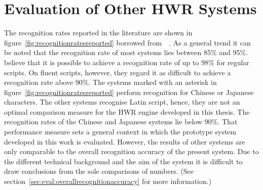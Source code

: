 


\section{Evaluation of Other HWR Systems}
\label{sec:eval:othersystems}

The recognition rates reported in the literature are shown in 
figure~\ref{fig:recognitionratesreported} borrowed 
from~~\citeyear{LiuJaegerNakagawa2004}.
As a general trend it can be noted that the recognition rate of most systems
lies between 85\% and 95\%. 
~\citeyear{LiuJaegerNakagawa2004}
believe that it is possible to achieve a recognition rate of up to 98\% 
for regular scripts. On fluent scripts, however, they regard it as difficult 
to achieve a recognition rate above 90\%.
The systems marked with an asterisk in figure~\ref{fig:recognitionratesreported}
perform recognition for Chinese or Japanese characters. 
The other systems recognise Latin script, hence, they are not an optimal
comparison measure for the HWR engine developed in this thesis.
The recognition rates of the Chinese and Japanese systems lie below 90\%. 
That performance measure sets a general context in which 
the prototype system developed in this work is evaluated.
However, the results of other systems are only comparable to the overall 
recognition accuracy of the present system. Due to the different technical
background and the aim of the system it is difficult to draw conclusions
from the sole comparisons of numbers. 
(See section~\ref{sec:eval:overallrecognitionaccuracy} for more information.)
